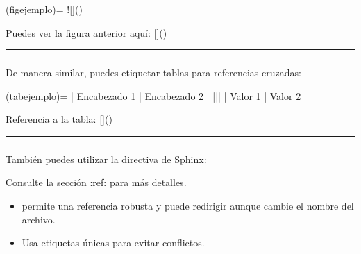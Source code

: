\documentclass[a4paper,10pt,oneside,spanish,openany]{sphinxmanual}
\begin{document}
\begin{sphinxVerbatim}[commandchars=\\\{\}]
(fig\PYGZhy{}ejemplo)=
![]()

Puedes ver la figura anterior aquí: []()
\end{sphinxVerbatim}


\bigskip\hrule\bigskip



\subsubsection{}
\label{\detokenize{configuracion_inicial/013.guia_de_myst_parser:referencias-a-tablas}}
\sphinxAtStartPar
De manera similar, puedes etiquetar tablas para referencias cruzadas:

\begin{sphinxVerbatim}[commandchars=\\\{\}]
(tab\PYGZhy{}ejemplo)=
| Encabezado 1 | Encabezado 2 |
|\PYGZhy{}\PYGZhy{}\PYGZhy{}\PYGZhy{}\PYGZhy{}\PYGZhy{}\PYGZhy{}\PYGZhy{}\PYGZhy{}\PYGZhy{}\PYGZhy{}\PYGZhy{}\PYGZhy{}|\PYGZhy{}\PYGZhy{}\PYGZhy{}\PYGZhy{}\PYGZhy{}\PYGZhy{}\PYGZhy{}\PYGZhy{}\PYGZhy{}\PYGZhy{}\PYGZhy{}\PYGZhy{}\PYGZhy{}|
| Valor 1    | Valor 2    |

Referencia a la tabla: []()
\end{sphinxVerbatim}


\bigskip\hrule\bigskip



\subsubsection{}
\label{\detokenize{configuracion_inicial/013.guia_de_myst_parser:referencias-con-la-directiva-ref}}
\sphinxAtStartPar
También puedes utilizar la directiva  de Sphinx:

\begin{sphinxVerbatim}[commandchars=\\\{\}]
Consulte la sección :ref:  para más detalles.
\end{sphinxVerbatim}
\begin{itemize}
\item {} 
\sphinxAtStartPar
{} permite una referencia robusta y puede redirigir aunque cambie el nombre del archivo.

\item {} 
\sphinxAtStartPar
Usa etiquetas únicas para evitar conflictos.

\end{itemize}
\end{document}

